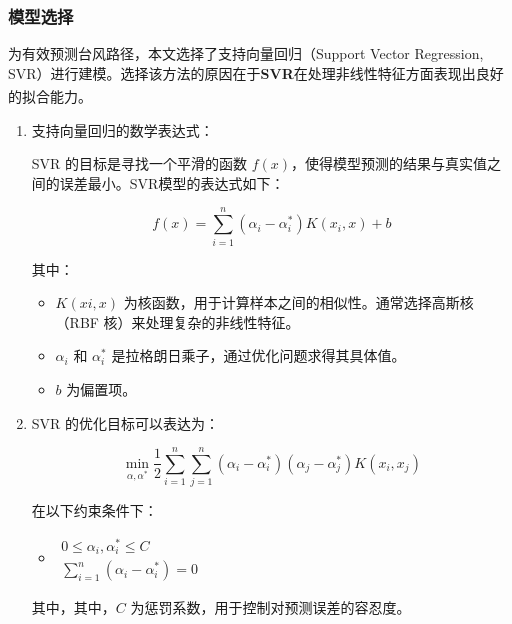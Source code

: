 \documentclass[withoutpreface,bwprint]{cumcmthesis}
\begin{document}
\subsubsection{模型选择}

为有效预测台风路径，本文选择了支持向量回归（Support Vector Regression, SVR）进行建模。选择该方法的原因在于\textbf{SVR}在处理非线性特征方面表现出良好的拟合能力\textsuperscript{\cite{dhiman2019hybrid}}。

\begin{enumerate}
    \item[(1)] 支持向量回归的数学表达式：

                SVR 的目标是寻找一个平滑的函数 $f(x)$，使得模型预测的结果与真实值之间的误差最小。SVR模型的表达式如下：

                \[f(x)=\sum_{i=1}^{n}\left(\alpha_{i}-\alpha_{i}^{*}\right) K\left(x_{i}, x\right)+b\]

                其中：

                \begin{itemize}
                    \item $K(xi,x)$ 为核函数，用于计算样本之间的相似性。通常选择高斯核（RBF 核）来处理复杂的非线性特征。

                    \item  $\alpha_i$ 和 $\alpha_i^*$ 是拉格朗日乘子，通过优化问题求得其具体值。

                    \item $b$ 为偏置项。
                \end{itemize}

    \item [(2)] SVR 的优化目标可以表达为：

                \[\min _{\alpha, \alpha^{*}} \frac{1}{2} \sum_{i=1}^{n} \sum_{j=1}^{n}\left(\alpha_{i}-\alpha_{i}^{*}\right)\left(\alpha_{j}-\alpha_{j}^{*}\right) K\left(x_{i}, x_{j}\right)\]

                在以下约束条件下：

        \begin{itemize}
            \setlength{\itemindent}{2em}
            \renewcommand{\labelitemi}{}  %
            \item $\begin{array}{c} 0 \leq \alpha_{i}, \alpha_{i}^{*} \leq C \\ \sum_{i=1}^{n}\left(\alpha_{i}-\alpha_{i}^{*}\right)=0 \end{array}$
        \end{itemize}


                其中，其中，$C$ 为惩罚系数，用于控制对预测误差的容忍度。
\end{enumerate}
\end{document}
